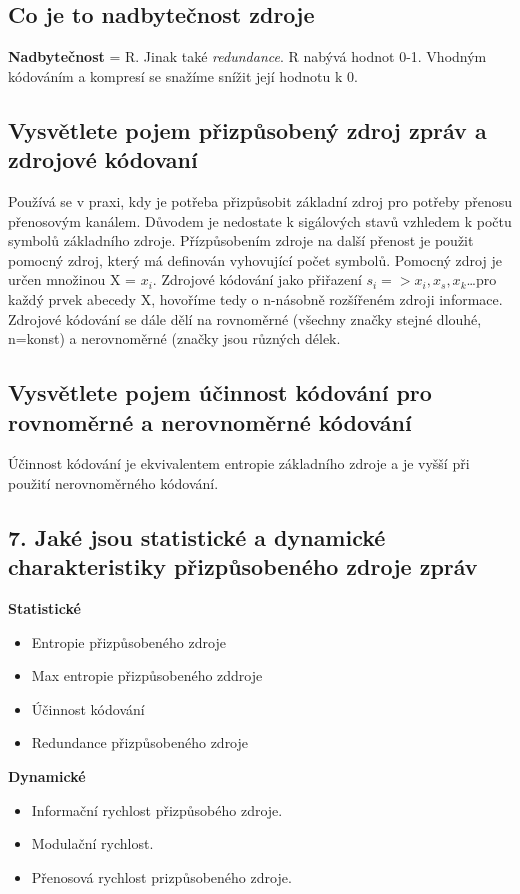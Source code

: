 \subsection{Co je to nadbytečnost zdroje }
\textbf{Nadbytečnost} = R.
Jinak také \textit{redundance}.
R nabývá hodnot 0-1.
Vhodným kódováním a kompresí se snažíme snížit její hodnotu k 0.

\subsection{Vysvětlete pojem přizpůsobený zdroj zpráv a zdrojové kódovaní}
Používá se v praxi, kdy je potřeba přizpůsobit základní zdroj pro potřeby přenosu přenosovým kanálem.
Důvodem je nedostate k sigálových stavů vzhledem k počtu symbolů základního zdroje. Přízpůsobením zdroje na další přenost je použit pomocný zdroj, který má definován vyhovující počet symbolů. Pomocný zdroj je určen množinou X = ${x_i}$.
Zdrojové kódování jako přiřazení $s_i => x_i,x_s,x_k$\dots pro každý prvek abecedy X, hovoříme tedy o n-násobně rozšířeném zdroji informace. Zdrojové kódování se dále dělí na rovnoměrné (všechny značky stejné dlouhé, n=konst) a nerovnoměrné (značky jsou různých délek.

\subsection{Vysvětlete pojem účinnost kódování pro rovnoměrné a nerovnoměrné kódování}
Účinnost kódování je ekvivalentem entropie základního zdroje a je vyšší při použití nerovnoměrného kódování.

\subsection{7.	Jaké jsou statistické a dynamické charakteristiky přizpůsobeného zdroje zpráv}
\textbf{Statistické}
\begin{itemize}
    \item Entropie přizpůsobeného zdroje
    \item Max entropie přizpůsobeného zddroje
    \item Účinnost kódování
    \item Redundance přizpůsobeného zdroje
\end{itemize}
\textbf{Dynamické}
\begin{itemize}
    \item Informační rychlost přizpůsobého zdroje.
    \item Modulační rychlost.
    \item Přenosová rychlost prizpůsobeného zdroje.
    
\end{itemize}


